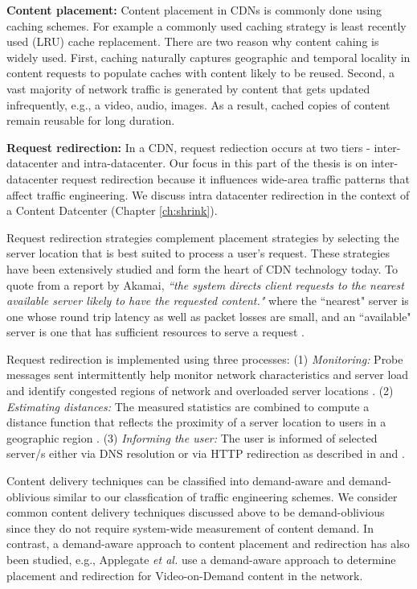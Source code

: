 \textbf{Content placement:} Content placement in CDNs is commonly done using caching schemes. For example a commonly used caching strategy is least recently used (LRU) cache replacement. There are two reason why content cahing is widely used. First, caching naturally captures geographic and temporal locality in content requests to populate caches with content likely to be reused. Second, a vast majority of network traffic is generated by content that gets updated infrequently, e.g., a video, audio, images. As a result, cached copies of content remain reusable for long duration. 


\textbf{Request redirection:} In a CDN, request rediection occurs at two tiers - inter-datacenter and intra-datacenter. Our focus in this part of the thesis is on inter-datacenter request redirection because it influences wide-area traffic patterns that affect traffic engineering. We discuss intra datacenter redirection in the context of a Content Datcenter (Chapter \ref{ch:shrink}).

Request redirection strategies complement placement strategies by selecting the server location that is best suited to process a user's request. These strategies have been extensively studied and form the heart of CDN technology today. To quote from a report by Akamai,  \emph{``the system directs client requests to the nearest available server likely to have the requested content."} where the ``nearest" server is one whose round trip latency as well as packet losses are small, and  an ``available" server is one that has sufficient resources to serve a request \cite{DilleyMPPSW02}. 

Request redirection is implemented using three processes: (1) \emph{Monitoring:} Probe messages sent intermittently help monitor network characteristics and server load and identify congested regions of network and overloaded server locations \cite{oasis,donar}. (2) \emph{Estimating distances:} The measured statistics are combined to compute a distance function that reflects the proximity of a server location to users in a geographic region \cite{donar}. (3) \emph{Informing the user:} The user is informed of selected server/s either via DNS resolution or via HTTP redirection as described in  \cite{DilleyMPPSW02} and  \cite{barbir2003known}.

Content delivery techniques can be classified into demand-aware and demand-oblivious similar to our classfication of traffic engineering schemes. We consider common content delivery techniques discussed above to be demand-oblivious since they do not require system-wide measurement of content demand. In contrast, a demand-aware approach to content placement and redirection has also been studied, e.g., Applegate \emph{et al.} use a demand-aware approach to determine placement and redirection for Video-on-Demand content in the network. 


